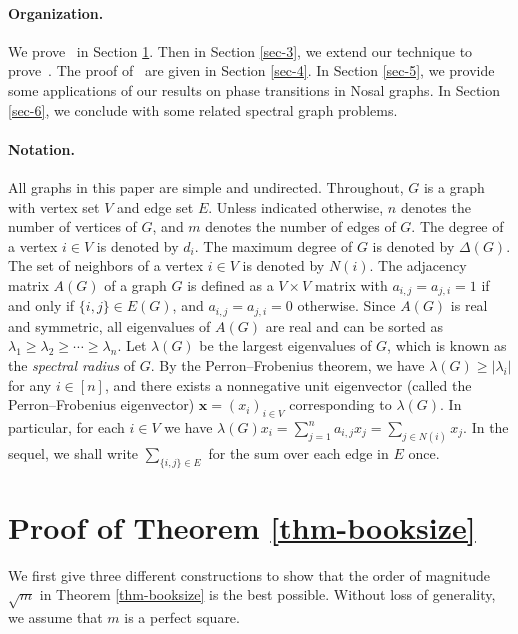 \documentclass[11pt,a4paper]{article}
\theoremstyle{definition}
\theoremstyle{remark}
\newcommand*{\abs}[1]{\lvert#1\rvert}
\begin{document}
\paragraph{Organization.} 
We prove~ in Section \ref{sec-2}. Then in Section \ref{sec-3}, we extend our technique to prove~. The proof of~ are given in Section \ref{sec-4}. In Section \ref{sec-5}, 
we provide some  applications of our results on phase transitions in Nosal graphs. In Section \ref{sec-6}, we conclude with some related spectral graph problems. 


\paragraph{Notation.}  
All graphs in this paper are simple and undirected. Throughout, $G$ is a graph with vertex set $V$ and edge set $E$. Unless indicated otherwise, $n$ denotes the number of vertices of $G$, and $m$ denotes the number of edges of $G$. The degree of a vertex $i\in V$ is denoted by
$d_i$. The maximum degree of $G$ is denoted by $\Delta(G)$. The set of neighbors of a vertex $i\in V$ is denoted by $N(i)$. 
The adjacency matrix $A(G)$ of a graph $G$ 
is defined as a $V\times V$ matrix 
with $a_{i,j}=a_{j,i}=1$ if and only if $\{i,j\}\in E(G)$, 
and $a_{i,j}=a_{j,i}=0$ otherwise. 
Since $A(G)$ is real and symmetric, all eigenvalues of
$A(G)$ are real and can be sorted as
$\lambda_1\ge \lambda_2 \ge \cdots \ge \lambda_n$. 
Let $\lambda (G)$ be the largest eigenvalues of  $G$, which is 
 known as the {\it spectral radius} of  $G$. 
 By the Perron--Frobenius theorem, 
we have $\lambda(G) \geq \abs{\lambda_i}$ for any $i \in [n]$, and there exists a nonnegative unit eigenvector (called the Perron--Frobenius eigenvector) $\bm{x} = (x_i)_{i \in V}$
corresponding to $\lambda (G)$. 
In particular, for each $i \in V$ we have $\lambda (G) x_i = 
\sum_{j=1}^n a_{i,j} x_j =  \sum_{j\in N(i)} x_j.$
In the sequel, we shall write $\sum_{\{i,j\} \in E}$ for the sum 
over each edge in $E$ once. 







\section{Proof of Theorem \ref{thm-booksize}}
\label{sec-2}

We first give three different constructions to show that the order of magnitude $\sqrt{m}$ in Theorem \ref{thm-booksize} is the best possible. Without loss of generality, we assume that $m$ is a perfect square.
\end{document}
